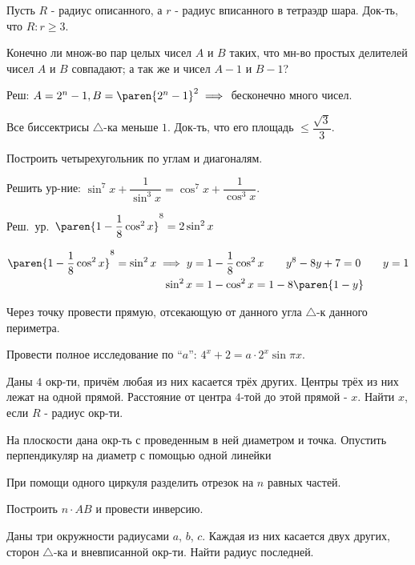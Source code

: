 \documentclass{article}
\begin{document}
\problem  %
Пусть $R$ - радиус описанного, а $r$ - радиус вписанного в тетраэдр шара.
Док-ть, что $R : r \geq 3$.


\problem  %
Конечно ли множ-во пар целых чисел $A$ и $B$ таких,
что мн-во простых делителей чисел $A$ и $B$ совпадают;
а так же и чисел $A - 1$ и $B - 1$?

Реш: $A = 2^{n} - 1, B = \paren{2^{n} - 1}^2 \implies$ бесконечно много чисел.


\problem  %
Все биссектрисы $\triangle$-ка меньше $1$.
Док-ть, что его площадь $\leq \dfrac{\sqrt{3}}{3}$.


\problem  %
Построить четырехугольник по углам и диагоналям.


\problem  %
Решить ур-ние:
$\sin^{7}{x} + \dfrac{1}{\sin^{3}{x}} = \cos^{7}{x} + \dfrac{1}{\cos^{3}{x}}$.


\problem  %
Реш.\ ур.\ $\paren{1 - \dfrac{1}{8} \cos^2 x}^{8} = 2 \sin^2 x$

\begin{align*}
  \paren{1 - \frac{1}{8} \cos^{2}{x}}^{8} = \sin^{2}{x}
  \implies
  y &= 1 - \frac{1}{8} \cos^{2}{x}
  \qquad y^{8} - 8 y + 7 = 0
  \qquad y = 1  \\
  \sin^{2}{x} &= 1 - \cos^{2}{x}
    = 1 - 8 \paren{1 - y}
\end{align*}


\problem  %
Через точку провести прямую, отсекающую от данного угла $\triangle$-к данного периметра.


\problem  %
Провести полное исследование по ``$a$'': $4^{x} + 2 = a \cdot 2^{x} \sin{\pi x}$.


\problem  %
Даны $4$ окр-ти, причём любая из них касается трёх других.
Центры трёх из них лежат на одной прямой.
Расстояние от центра $4$-той до этой прямой - $x$.
Найти $x$, если $R$ - радиус окр-ти.


\problem  %
На плоскости дана окр-ть с проведенным в ней диаметром и точка.
Опустить перпендикуляр на диаметр с помощью одной линейки


\problem  %
При помощи одного циркуля разделить отрезок на $n$ равных частей.

Построить $n \cdot AB$ и провести инверсию.


\problem  %
Даны три окружности радиусами $a$, $b$, $c$.
Каждая из них касается двух других, сторон $\triangle$-ка и вневписанной окр-ти.
Найти радиус последней.
\end{document}
